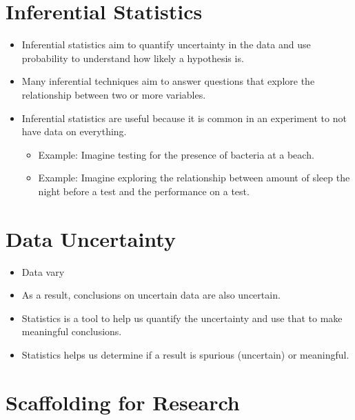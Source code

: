 \documentclass[12pt]{article}
\begin{document}
\section{Inferential Statistics}\label{inferential-statistics}

\begin{itemize}
\itemsep1pt\parskip0pt
\item
  Inferential statistics aim to quantify uncertainty in the data and use
  probability to understand how likely a hypothesis is.
\item
  Many inferential techniques aim to answer questions that explore the
  relationship between two or more variables.
\item
  Inferential statistics are useful because it is common in an
  experiment to not have data on everything.

  \begin{itemize}
  \itemsep1pt\parskip0pt
  \item
    Example: Imagine testing for the presence of bacteria at a beach.
  \item
    Example: Imagine exploring the relationship between amount of sleep
    the night before a test and the performance on a test.
  \end{itemize}
\end{itemize}

\section{Data Uncertainty}\label{data-uncertainty}

\begin{itemize}
\itemsep1pt\parskip0pt
\item
  Data vary
\item
  As a result, conclusions on uncertain data are also uncertain.
\item
  Statistics is a tool to help us quantify the uncertainty and use that
  to make meaningful conclusions.
\item
  Statistics helps us determine if a result is spurious (uncertain) or
  meaningful.
\end{itemize}

\section{Scaffolding for Research}\label{scaffolding-for-research}
\end{document}
